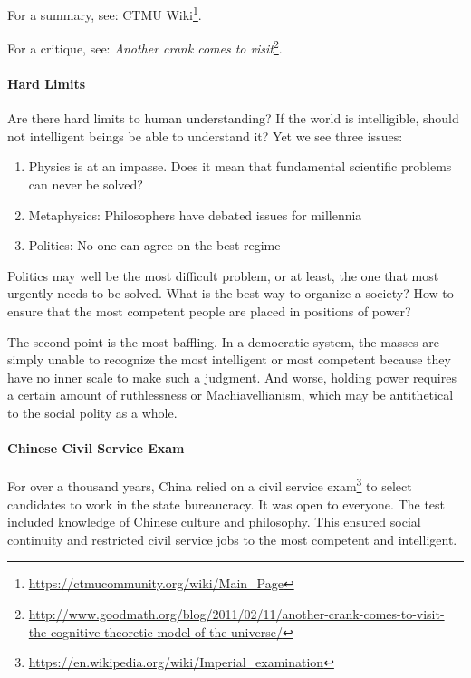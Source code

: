 For a summary, see: CTMU Wiki\footnote{\url{https://ctmucommunity.org/wiki/Main\_Page}}.

For a critique, see: \textit{Another crank comes to visit}\footnote{\url{http://www.goodmath.org/blog/2011/02/11/another-crank-comes-to-visit-the-cognitive-theoretic-model-of-the-universe/}}.

\paragraph{Hard Limits}


Are there hard limits to human understanding? If the world is intelligible, should not intelligent beings be able to understand it? Yet we see three issues:

\begin{enumerate}


\item Physics is at an impasse. Does it mean that fundamental scientific problems can never be solved?

\item Metaphysics: Philosophers have debated issues for millennia

\item Politics: No one can agree on the best regime
\end{enumerate}


Politics may well be the most difficult problem, or at least, the one that most urgently needs to be solved. What is the best way to organize a society? How to ensure that the most competent people are placed in positions of power?

The second point is the most baffling. In a democratic system, the masses are simply unable to recognize the most intelligent or most competent because they have no inner scale to make such a judgment. And worse, holding power requires a certain amount of ruthlessness or Machiavellianism, which may be antithetical to the social polity as a whole.

\paragraph{Chinese Civil Service Exam}


For over a thousand years, China relied on a civil service exam\footnote{\url{https://en.wikipedia.org/wiki/Imperial\_examination}} to select candidates to work in the state bureaucracy. It was open to everyone. The test included knowledge of Chinese culture and philosophy. This ensured social continuity and restricted civil service jobs to the most competent and intelligent.

